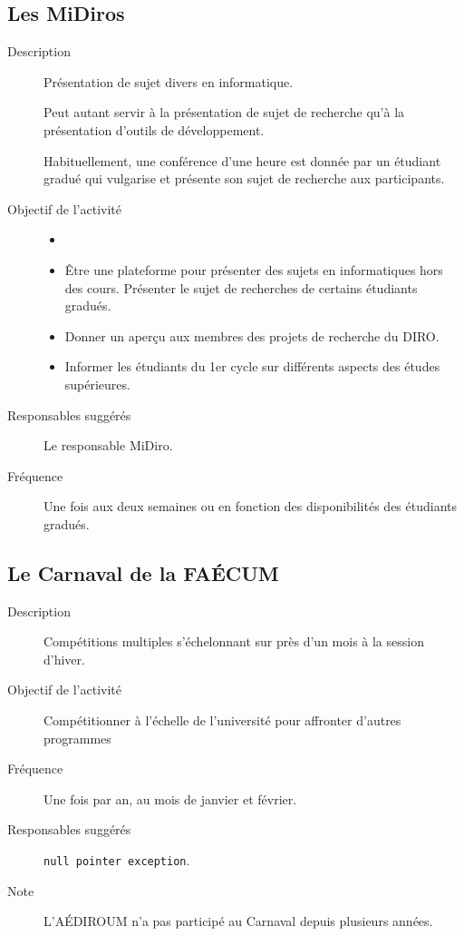 \documentclass{aediroum}
\begin{document}
\subsection{Les MiDiros}
\begin{description}
	\item[Description] Présentation de sujet divers en informatique.

	Peut autant servir à la présentation de sujet de recherche qu'à la présentation d'outils de développement.

	Habituellement, une conférence d'une heure est donnée par un étudiant gradué qui vulgarise et présente son sujet de recherche aux participants.
	\item[Objectif de l'activité]
	\begin{itemize}
		\item[]
		\item Être une plateforme pour présenter des sujets en informatiques hors des cours. Présenter le sujet de recherches de certains étudiants gradués.
		\item Donner un aperçu aux membres des projets de recherche du DIRO.
		\item Informer les étudiants du 1er cycle sur différents aspects des études supérieures.
	\end{itemize}
	\item[Responsables suggérés] Le responsable MiDiro.
 	\item[Fréquence] Une fois aux deux semaines ou en fonction des disponibilités des étudiants gradués.
\end{description}

\subsection{Le Carnaval de la FAÉCUM}
\begin{description}
	\item[Description] Compétitions multiples s'échelonnant sur près d'un mois à la session d'hiver.
	\item[Objectif de l'activité] Compétitionner à l'échelle de l'université pour affronter d'autres programmes
	\item[Fréquence] Une fois par an, au mois de janvier et février.
	\item[Responsables suggérés] \texttt{null pointer exception}.
	\item[Note] L'AÉDIROUM n'a pas participé au Carnaval depuis plusieurs années.
\end{description}
\end{document}

